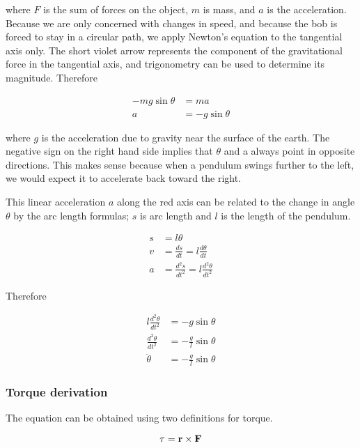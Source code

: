 where $F$ is the sum of forces on the object, $m$ is mass, and $a$ is the
acceleration. Because we are only concerned with changes in speed, and because
the bob is forced to stay in a circular path, we apply Newton's equation to the
tangential axis only. The short violet arrow represents the component of the
gravitational force in the tangential axis, and trigonometry can be used to
determine its magnitude. Therefore

\begin{align*}
  -mg\sin\theta &= ma \\
  a &= -g\sin\theta
\end{align*}

where $g$ is the acceleration due to gravity near the surface of the earth. The
negative sign on the right hand side implies that $\theta$ and a always point in
opposite directions. This makes sense because when a pendulum swings further to
the left, we would expect it to accelerate back toward the right.

This linear acceleration $a$ along the red axis can be related to the change in
angle $\theta$ by the arc length formulas; $s$ is arc length and $l$ is the
length of the pendulum.

\begin{align}
  s &= l\theta \label{eq:arc_length} \\
  v &= \frac{ds}{dt} = l\frac{d\theta}{dt} \nonumber \\
  a &= \frac{d^2s}{dt^2} = l\frac{d^2\theta}{dt^2} \nonumber
\end{align}

Therefore

\begin{align*}
  l\frac{d^2\theta}{dt^2} &= -g\sin\theta \\
  \frac{d^2\theta}{dt^2} &= -\frac{g}{l}\sin\theta \\
  \ddot{\theta} &= -\frac{g}{l}\sin\theta
\end{align*}

\subsubsection{Torque derivation}

The equation can be obtained using two definitions for torque.

\begin{equation*}
  \mathbf{\tau} = \mathbf{r} \times \mathbf{F}
\end{equation*}

